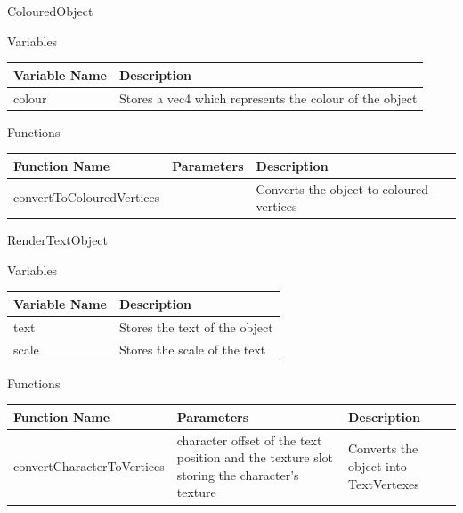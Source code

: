 \documentclass{article}
\begin{document}
                ColouredObject
                \begin{center}
                    Variables
                    \begin{tabular}{ | m{} | m{} | }
                        \hline
                        \textbf{Variable Name} & \textbf{Description} \\
                        \hline
                        colour & Stores a vec4 which represents the colour of the object \\
                        \hline
                    \end{tabular}
                    Functions
                    \begin{tabular}{ | m{} | m{}| m{} | }
                        \hline
                        \textbf{Function Name} & \textbf{Parameters} & \textbf{Description} \\
                        \hline
                        convertToColouredVertices & & Converts the object to coloured vertices \\
                        \hline
                    \end{tabular}
                \end{center}
                RenderTextObject
                \begin{center}
                    Variables
                    \begin{tabular}{ | m{} | m{} | }
                        \hline
                        \textbf{Variable Name} & \textbf{Description} \\
                        \hline
                        text & Stores the text of the object \\
                        \hline
                        scale & Stores the scale of the text \\
                        \hline
                    \end{tabular}
                    Functions
                    \begin{tabular}{ | m{} | m{}| m{} | }
                        \hline
                        \textbf{Function Name} & \textbf{Parameters} & \textbf{Description} \\
                        \hline
                        convertCharacterToVertices & character offset of the text position and the texture slot storing the character's texture & Converts the object into TextVertexes \\
                        \hline
                    \end{tabular}
                \end{center}
\end{document}
